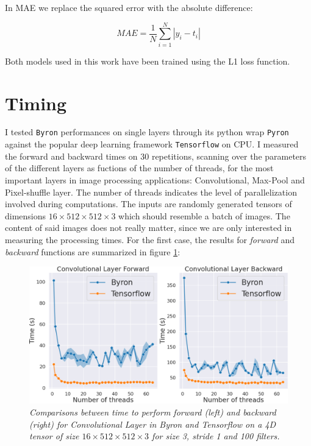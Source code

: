 \documentclass[12pt,a4paper]{report}
\begin{document}
In MAE we replace the squared error with the absolute difference:

\begin{equation}
 MAE = \frac{1}{N} \sum_{i=1}^{N} |y_i - t_i|
\end{equation}

Both models used in this work have been trained using the L1 loss function. 

\section{Timing}

I tested {\tt Byron} performances on single layers through its python wrap {\tt Pyron} against the popular deep learning framework {\tt Tensorflow} on CPU.
I measured the forward and backward times on 30 repetitions, scanning over the parameters of the different layers as fuctions of the number of threads, for the most important layers in image processing applications: Convolutional, Max-Pool and Pixel-shuffle layer.
The number of threads indicates the level of parallelization involved during computations.
The inputs are randomly generated tensors of dimensions $16 \times 512 \times 512 \times 3$ which should resemble a batch of images. 
The content of said images does not really matter, since we are only interested in measuring the processing times.
For the first case, the results for {\it forward} and {\it backward} functions are summarized in figure \ref{fig:time-conv}:

\begin{figure}[H]
\centering
\includegraphics[scale=0.3]{./images/convolutional_timing_3_1.png}
\caption{\it Comparisons between time to perform forward (left) and backward (right) for Convolutional Layer in Byron and Tensorflow on a 4D tensor of size $16 \times 512 \times 512 \times 3$ for size 3, stride 1 and 100 filters.}
\label{fig:time-conv}
\end{figure}
\end{document}
